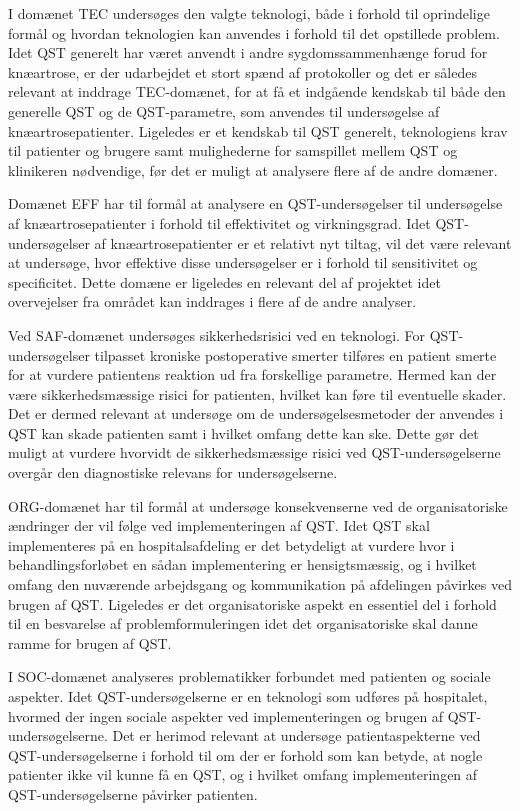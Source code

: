 I domænet TEC undersøges den valgte teknologi, både i forhold til oprindelige formål og hvordan teknologien kan anvendes i forhold til det opstillede problem. Idet QST generelt har været anvendt i andre sygdomssammenhænge forud for knæartrose, er der udarbejdet et stort spænd af protokoller og det er således relevant at inddrage TEC-domænet, for at få et indgående kendskab til både den generelle QST og de QST-parametre, som anvendes til undersøgelse af knæartrosepatienter. Ligeledes er et kendskab til QST generelt, teknologiens krav til patienter og brugere samt mulighederne for samspillet mellem QST og klinikeren nødvendige, før det er muligt at analysere flere af de andre domæner. 

Domænet EFF har til formål at analysere en QST-undersøgelser til undersøgelse af knæartrosepatienter i forhold til effektivitet og virkningsgrad. Idet QST-undersøgelser af knæartrosepatienter er et relativt nyt tiltag, vil det være relevant at undersøge, hvor effektive disse undersøgelser er i forhold til sensitivitet og specificitet. Dette domæne er ligeledes en relevant del af projektet idet overvejelser fra området kan inddrages i flere af de andre analyser.   

Ved SAF-domænet undersøges sikkerhedsrisici ved en teknologi. For QST-undersøgelser tilpasset kroniske postoperative smerter tilføres en patient smerte for at vurdere patientens reaktion ud fra forskellige parametre. Hermed kan der være sikkerhedsmæssige risici for patienten, hvilket kan føre til eventuelle skader. Det er dermed relevant at undersøge om de undersøgelsesmetoder der anvendes i QST kan skade patienten samt i hvilket omfang dette kan ske. Dette gør det muligt at vurdere hvorvidt de sikkerhedsmæssige risici ved QST-undersøgelserne overgår den diagnostiske relevans for undersøgelserne. 

ORG-domænet har til formål at undersøge konsekvenserne ved de organisatoriske ændringer der vil følge ved implementeringen af QST. Idet QST skal implementeres på en hospitalsafdeling er det betydeligt at vurdere hvor i behandlingsforløbet en sådan implementering er hensigtsmæssig, og i hvilket omfang den nuværende arbejdsgang og kommunikation på afdelingen påvirkes ved brugen af QST. Ligeledes er det organisatoriske aspekt en essentiel del i forhold til en besvarelse af problemformuleringen idet det organisatoriske skal danne ramme for brugen af QST.

I SOC-domænet analyseres problematikker forbundet med patienten og sociale aspekter. Idet QST-undersøgelserne er en teknologi som udføres på hospitalet, hvormed der ingen sociale aspekter ved implementeringen og brugen af QST-undersøgelserne. Det er herimod relevant at undersøge patientaspekterne ved QST-undersøgelserne i forhold til om  der er forhold som kan betyde, at nogle patienter ikke vil kunne få en QST, og i hvilket omfang implementeringen af QST-undersøgelserne påvirker patienten.

